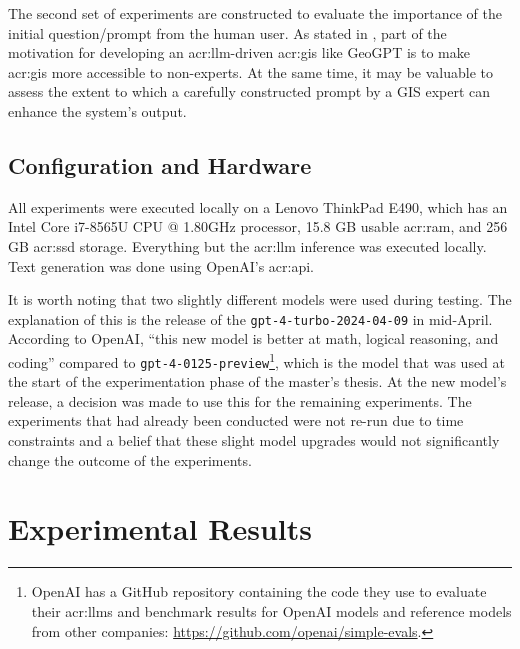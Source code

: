 The second set of experiments are constructed to evaluate the importance of the initial question/prompt from the human user. As stated in , part of the motivation for developing an \acrshort{acr:llm}-driven \acrshort{acr:gis} like GeoGPT is to make \acrshort{acr:gis} more accessible to non-experts. At the same time, it may be valuable to assess the extent to which a carefully constructed prompt by a GIS expert can enhance the system's output.


\subsection{Configuration and Hardware}
\label{subsec:configuration-and-hardware}

All experiments were executed locally on a Lenovo ThinkPad E490, which has an Intel{\textregistered} Core\texttrademark{} i7-8565U CPU @ 1.80GHz processor, 15.8 GB usable \acrshort{acr:ram}, and 256 GB \acrshort{acr:ssd} storage. Everything but the \acrshort{acr:llm} inference was executed locally. Text generation was done using OpenAI's \acrshort{acr:api}.

It is worth noting that two slightly different models were used during testing. The explanation of this is the release of the \texttt{gpt-4-turbo-2024-04-09} in mid-April. According to OpenAI, \enquote{this new model is better at math, logical reasoning, and coding} compared to \texttt{gpt-4-0125-preview}\footnote{OpenAI has a GitHub repository containing the code they use to evaluate their \glspl{acr:llm} and benchmark results for OpenAI models and reference models from other companies: \url{https://github.com/openai/simple-evals}.}, which is the model that was used at the start of the experimentation phase of the master's thesis. At the new model's release, a decision was made to use this for the remaining experiments. The experiments that had already been conducted were not re-run due to time constraints and a belief that these slight model upgrades would not significantly change the outcome of the experiments.


\section{Experimental Results}
\label{sec:experimental-results}

